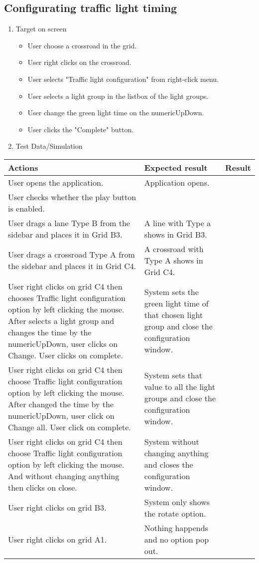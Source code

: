 \newpage

\subsection{Configurating traffic light timing}

\begin{enumerate}

	\item Target on screen
	\begin{itemize}
		\item User choose a crossroad in the grid.
		\item User right clicks on the crossroad.
		\item User selects "Traffic light configuration" from right-click menu.
		\item User selects a light group in the listbox of the light groups.
		\item User change the green light time on the numericUpDown.
		\item User clicks the "Complete" button. 
	\end{itemize}
	\item Test Data/Simulation
\end{enumerate}	
	\begin{tabularx}{\textwidth}{|X|X|p{2.5cm}|}\hline
		Actions & Expected result & Result \\\hline
		User opens the application.& Application opens. &  \pass \\\hline
		User checks whether the play button is enabled. & &  \pass \\\hline
		User drags a lane Type B from the sidebar and places it in Grid B3. & A line with Type a shows in Grid B3. & \pass \\\hline
		User drags a crossroad Type A from the sidebar and places it in Grid C4. & A crossroad with Type A shows in Grid C4. & \pass \\\hline
		User right clicks on grid C4 then chooses Traffic light configuration  option by left clicking the mouse. After selects a light group and changes the time by the numericUpDown, user clicks on Change. User clicks on complete. & System sets the green light time of that chosen light group and close the configuration window.  & \pass \\\hline
		User right clicks on grid C4 then choose Traffic light configuration option by left clicking the mouse. After changed the time by the numericUpDown, user click on Change all. User click on complete. & System sets that value to all the light groups and close the configuration window. & \pass \\\hline
		User right clicks on grid C4 then choose Traffic light configuration option by left clicking the mouse. And without changing anything then clicks on close. & System without changing anything and closes the configuration window. & \pass \\\hline
		User right clicks on grid B3. & System only shows the rotate option. & \pass \\\hline
		User right clicks on grid A1. & Nothing happends and no option pop out. & \pass \\\hline
	\end{tabularx}
